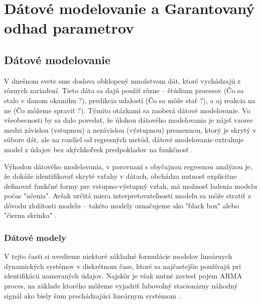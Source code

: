 \part{Dátové modelovanie a Garantovaný odhad parametrov}
\chapter{Dátové modelovanie}
V dnešnom svete sme doslova obklopený množstvom dát, ktoré vychádzajú z rôznych zariadení. Tieto dáta sa dajú použiť rôzne -- štúdium procesov (Čo sa stalo v danom okamihu ?), predikcia udalostí (Čo sa môže stať ?), a aj reakcia na ne (Čo môžeme spraviť ?). Týmito otázkami sa zaoberá dátové modelovanie. Vo všeobecnosti by sa dalo povedať, že úlohou dátového modelovania je nájsť vzorec medzi závislou (vstupnou) a nezávislou (výstupnou) premennou, ktorý je skrytý v súbore dát, ale na rozdiel od regresných metód, dátové modelovanie extrahuje model z údajov bez akýchkoľvek predpokladov na funkčnosť \cite{mishra:data_modeling:2018}.

Výhodou dátového modelovania, v porovnaní s obyčajnou regresnou analýzou je, že dokáže identifikovať skryté vzťahy v dátach, obchádza nutnosť explicitne definovať funkčné formy pre vstupno-výstupný vzťah, má možnosť ladenia modelu počas "učenia". Avšak určitá miera interpretovateľnosti modelu sa môže stratiť z dôvodu zložitosti modelu -- takéto modely označujeme ako "black box" alebo "čierna skrinka" \cite{mishra:data_modeling:2018}.

\section{Dátové modely}
V tejto časti si uvedieme niektoré základné formulácie modelov lineárnych dynamických systémov v diskrétnom čase, ktoré sa najčastejšie používajú pri identifikácii nameraných údajov. Najskôr je však nutné zaviesť pojem ARMA proces, na základe ktorého môžeme vyjadriť ľubovoľný stacionárny náhodný signál ako biely šum prechádzajúci lineárnym systémom \cite{fikar:identifikacia:1999}.

